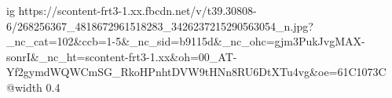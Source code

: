  
 
 
 
 

\ifcmt
  ig https://scontent-frt3-1.xx.fbcdn.net/v/t39.30808-6/268256367_4818672961518283_3426237215290563054_n.jpg?_nc_cat=102&ccb=1-5&_nc_sid=b9115d&_nc_ohc=gjm3PukJvgMAX-sonrI&_nc_ht=scontent-frt3-1.xx&oh=00_AT-Yf2gymdWQWCmSG_RkoHPnhtDVW9tHNn8RU6DtXTu4vg&oe=61C1073C
  @width 0.4
\fi
